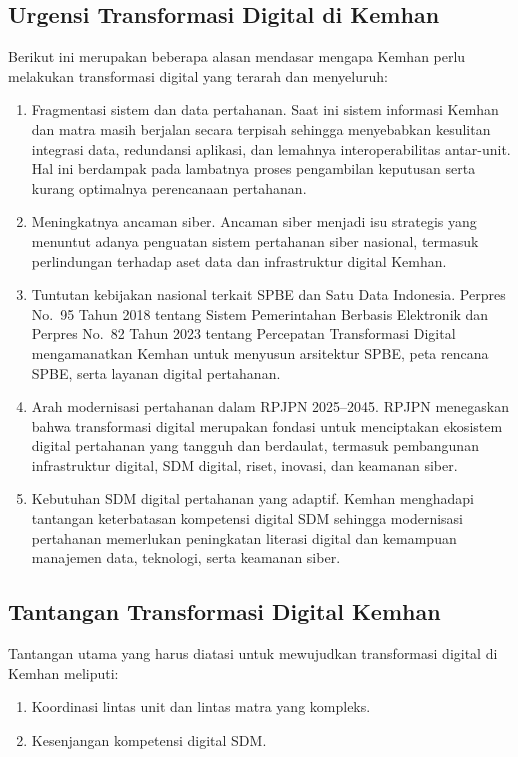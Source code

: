 \subsection{Urgensi Transformasi Digital di Kemhan}
Berikut ini merupakan beberapa alasan mendasar mengapa Kemhan perlu melakukan transformasi digital yang terarah dan menyeluruh:
\begin{enumerate}
  \item Fragmentasi sistem dan data pertahanan.
  Saat ini sistem informasi Kemhan dan matra masih berjalan secara terpisah sehingga menyebabkan kesulitan integrasi data, redundansi aplikasi, dan lemahnya interoperabilitas antar-unit.
  Hal ini berdampak pada lambatnya proses pengambilan keputusan serta kurang optimalnya perencanaan pertahanan.
  \item Meningkatnya ancaman siber.
  Ancaman siber menjadi isu strategis yang menuntut adanya penguatan sistem pertahanan siber nasional,
  termasuk perlindungan terhadap aset data dan infrastruktur digital Kemhan.
  \item Tuntutan kebijakan nasional terkait SPBE dan Satu Data Indonesia.
  Perpres No.~95 Tahun 2018 tentang Sistem Pemerintahan Berbasis Elektronik \parencite{KementerianKomunikasidanInformatika2018} dan Perpres No.~82 Tahun 2023 tentang Percepatan Transformasi Digital \parencite{RepublikIndonesia2023} mengamanatkan Kemhan untuk menyusun arsitektur SPBE, peta rencana SPBE, serta layanan digital pertahanan.
  \item Arah modernisasi pertahanan dalam RPJPN 2025–2045.
  RPJPN menegaskan bahwa transformasi digital merupakan fondasi untuk menciptakan ekosistem digital pertahanan yang tangguh dan berdaulat, termasuk pembangunan infrastruktur digital, SDM digital, riset, inovasi, dan keamanan siber.
  \item Kebutuhan SDM digital pertahanan yang adaptif.
  Kemhan menghadapi tantangan keterbatasan kompetensi digital SDM sehingga modernisasi pertahanan memerlukan peningkatan literasi digital dan kemampuan manajemen data, teknologi, serta keamanan siber.
\end{enumerate}

\subsection{Tantangan Transformasi Digital Kemhan}
Tantangan utama yang harus diatasi untuk mewujudkan transformasi digital di Kemhan meliputi:
\begin{enumerate}
  \item Koordinasi lintas unit dan lintas matra yang kompleks.
  \item Kesenjangan kompetensi digital SDM.
\end{enumerate}

